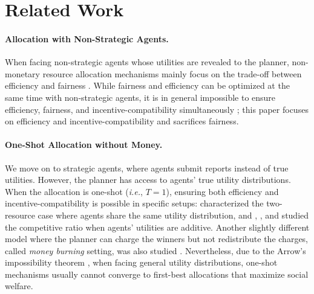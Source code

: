 \section{Related Work}
\label{sec:related work}
\paragraph{Allocation with Non-Strategic Agents.}
When facing non-strategic agents whose utilities are revealed to the planner, non-monetary resource allocation mechanisms mainly focus on the trade-off between efficiency and fairness \citep{moulin2002proportional,procaccia2013approximate,caragiannis2019unreasonable}.
While fairness and efficiency can be optimized at the same time with non-strategic agents, it is in general impossible to ensure efficiency, fairness, and incentive-compatibility simultaneously \citep{budish2011combinatorial}; this paper focuses on efficiency and incentive-compatibility and sacrifices fairness.

\paragraph{One-Shot Allocation without Money.}
We move on to strategic agents, where agents submit reports instead of true utilities. However, the planner has access to agents' true utility distributions.
When the allocation is one-shot (\textit{i.e.}, $T=1$), ensuring both efficiency and incentive-compatibility is possible in specific setups: \citet{miralles2012cardinal} characterized the two-resource case where agents share the same utility distribution, and \citet{guo2010strategy}, \citet{han2011strategy}, and \citet{cole2013positive} studied the competitive ratio when agents' utilities are additive. Another slightly different model where the planner can charge the winners but not redistribute the charges, called \textit{money burning} setting, was also studied \citep{hartline2008optimal,hoppe2009theory,condorelli2012money}. Nevertheless, due to the Arrow's impossibility theorem \citep{arrow1950difficulty,gi73,s75}, when facing general utility distributions, one-shot mechanisms usually cannot converge to first-best allocations that maximize social welfare.


